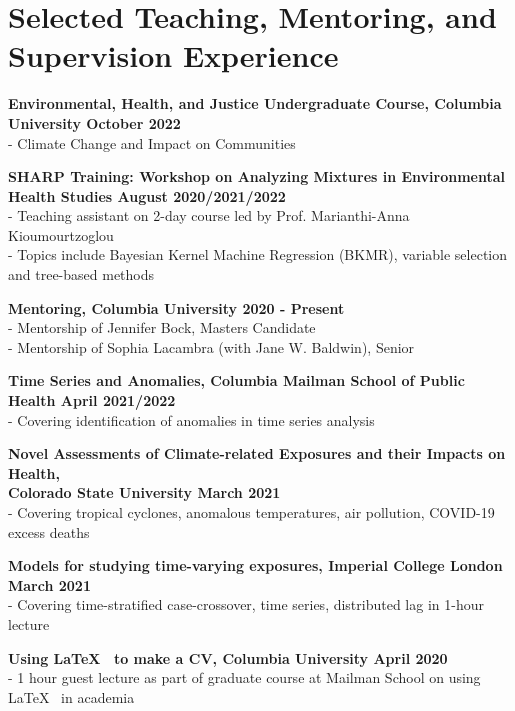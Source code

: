 \section*{Selected Teaching, Mentoring, and Supervision Experience}


\noindent \textbf{Environmental, Health, and Justice Undergraduate Course, Columbia University \hfill October 2022}\\
\noindent - Climate Change and Impact on Communities
\bigskip

\noindent \textbf{SHARP Training: Workshop on Analyzing Mixtures in Environmental Health Studies \hfill August 2020/2021/2022}\\
\noindent - Teaching assistant on 2-day course led by Prof. Marianthi-Anna Kioumourtzoglou\\
\noindent - Topics include Bayesian Kernel Machine Regression (BKMR), variable selection and tree-based methods \bigskip

\noindent \textbf{Mentoring, Columbia University \hfill 2020 - Present}\\
\noindent - Mentorship of Jennifer Bock, Masters Candidate\\
\noindent - Mentorship of Sophia Lacambra (with Jane W. Baldwin), Senior
\bigskip

\noindent \textbf{Time Series and Anomalies, Columbia Mailman School of Public Health \hfill April 2021/2022}\\
\noindent - Covering identification of anomalies in time series analysis
\bigskip

\noindent \textbf{Novel Assessments of Climate-related Exposures and their Impacts on Health, \\Colorado State University \hfill March 2021}\\
\noindent - Covering tropical cyclones, anomalous temperatures, air pollution, COVID-19 excess deaths \bigskip

\noindent \textbf{Models for studying time-varying exposures, Imperial College London \hfill March 2021}\\
\noindent - Covering time-stratified case-crossover, time series, distributed lag in 1-hour lecture
\bigskip

\noindent \textbf{Using \LaTeX ~ to make a CV, Columbia University \hfill April 2020}\\
\noindent - 1 hour guest lecture as part of graduate course at Mailman School on using \LaTeX ~ in academia \bigskip

